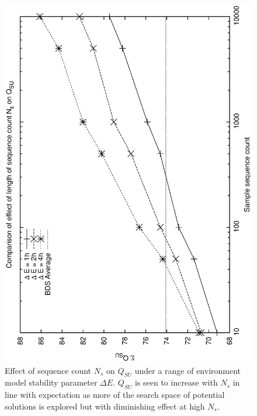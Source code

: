 \begin{figure}[htp]
\begin{center}
  \includegraphics[scale=0.5, angle=-90]{figures/ns_env_su.eps}
\caption[Effect of sequence count $N_s$ on $Q_{SU}$ under a range of environmental conditions]
{Effect of sequence count $N_s$ on $Q_{SU}$ under a range of environment model stability parameter $\Delta E$. $Q_{SU}$ is seen to increase with $N_s$ in line with expectation as more of the search space of potential solutions is explored but with diminishing effect at high $N_s$.}
\label{fig:ns_denv}
\end{center}
\end{figure}

